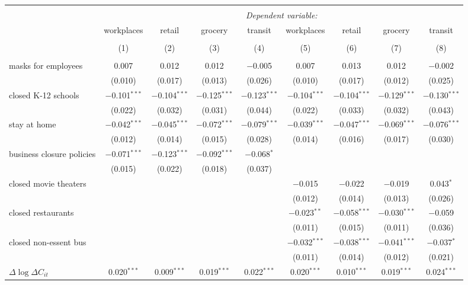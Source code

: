 \begin{tabular}{@{\extracolsep{1pt}}lcccccccc} 
\\[-1.8ex]\hline 
\hline \\[-1.8ex] 
 & \multicolumn{8}{c}{\textit{Dependent variable:}} \\ 
\cline{2-9} 
 & workplaces & retail & grocery & transit & workplaces & retail & grocery & transit \\ 
\\[-1.8ex] & (1) & (2) & (3) & (4) & (5) & (6) & (7) & (8)\\ 
\hline \\[-1.8ex] 
 masks for employees & 0.007 & 0.012 & 0.012 & $-$0.005 & 0.007 & 0.013 & 0.012 & $-$0.002 \\ 
  & (0.010) & (0.017) & (0.013) & (0.026) & (0.010) & (0.017) & (0.012) & (0.025) \\ 
  closed K-12 schools & $-$0.101$^{***}$ & $-$0.104$^{***}$ & $-$0.125$^{***}$ & $-$0.123$^{***}$ & $-$0.104$^{***}$ & $-$0.104$^{***}$ & $-$0.129$^{***}$ & $-$0.130$^{***}$ \\ 
  & (0.022) & (0.032) & (0.031) & (0.044) & (0.022) & (0.033) & (0.032) & (0.043) \\ 
  stay at home & $-$0.042$^{***}$ & $-$0.045$^{***}$ & $-$0.072$^{***}$ & $-$0.079$^{***}$ & $-$0.039$^{***}$ & $-$0.047$^{***}$ & $-$0.069$^{***}$ & $-$0.076$^{***}$ \\ 
  & (0.012) & (0.014) & (0.015) & (0.028) & (0.014) & (0.016) & (0.017) & (0.030) \\ 
  business closure policies & $-$0.071$^{***}$ & $-$0.123$^{***}$ & $-$0.092$^{***}$ & $-$0.068$^{*}$ &  &  &  &  \\ 
  & (0.015) & (0.022) & (0.018) & (0.037) &  &  &  &  \\ 
  closed movie theaters &  &  &  &  & $-$0.015 & $-$0.022 & $-$0.019 & 0.043$^{*}$ \\ 
  &  &  &  &  & (0.012) & (0.014) & (0.013) & (0.026) \\ 
  closed restaurants &  &  &  &  & $-$0.023$^{**}$ & $-$0.058$^{***}$ & $-$0.030$^{***}$ & $-$0.059 \\ 
  &  &  &  &  & (0.011) & (0.015) & (0.011) & (0.036) \\ 
  closed non-essent bus &  &  &  &  & $-$0.032$^{***}$ & $-$0.038$^{***}$ & $-$0.041$^{***}$ & $-$0.037$^{*}$ \\ 
  &  &  &  &  & (0.011) & (0.014) & (0.012) & (0.021) \\ 
  $\Delta \log \Delta C_{it}$ & 0.020$^{***}$ & 0.009$^{***}$ & 0.019$^{***}$ & 0.022$^{***}$ & 0.020$^{***}$ & 0.010$^{***}$ & 0.019$^{***}$ & 0.024$^{***}$ \\ 

\end{tabular}
